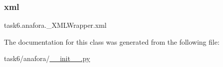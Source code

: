 \subsubsection{\texorpdfstring{xml}{xml}}
{\footnotesize\ttfamily task6.\+anafora.\+\_\+\+X\+M\+L\+Wrapper.\+xml}



The documentation for this class was generated from the following file\+:\begin{DoxyCompactItemize}
\item 
task6/anafora/\hyperlink{task6_2anafora_2____init_____8py}{\+\_\+\+\_\+init\+\_\+\+\_\+.\+py}\end{DoxyCompactItemize}
